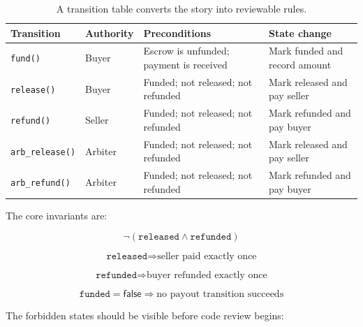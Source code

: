 \begin{table}[htbp]
\centering
\small
\renewcommand{\arraystretch}{1.18}
\begin{tabularx}{\textwidth}{@{}>{\RaggedRight\arraybackslash}p{}>{\RaggedRight\arraybackslash}p{}>{\RaggedRight\arraybackslash}p{}X@{}}
\toprule
Transition & Authority & Preconditions & State change \\
\midrule
\texttt{fund()} & Buyer & Escrow is unfunded; payment is received & Mark funded and record amount \\
\texttt{release()} & Buyer & Funded; not released; not refunded & Mark released and pay seller \\
\texttt{refund()} & Seller & Funded; not released; not refunded & Mark refunded and pay buyer \\
\texttt{arb\_release()} & Arbiter & Funded; not released; not refunded & Mark released and pay seller \\
\texttt{arb\_refund()} & Arbiter & Funded; not released; not refunded & Mark refunded and pay buyer \\
\bottomrule
\end{tabularx}
\caption{A transition table converts the story into reviewable rules.}
\end{table}

The core invariants are:

\[
\neg(\texttt{released} \wedge \texttt{refunded})
\]

\[
\texttt{released} \Rightarrow \text{seller paid exactly once}
\]

\[
\texttt{refunded} \Rightarrow \text{buyer refunded exactly once}
\]

\[
\texttt{funded} = \mathsf{false} \Rightarrow \text{no payout transition succeeds}
\]

The forbidden states should be visible before code review begins:

